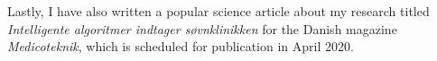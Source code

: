     
    
    
    Lastly, I have also written a popular science article about my research titled \textit{Intelligente algoritmer indtager søvnklinikken} for the Danish magazine \textit{Medicoteknik}, which is scheduled for publication in April 2020.

\endgroup

